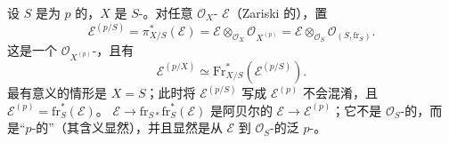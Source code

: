 设 $S$ 是为 $p$ 的，$X$ 是 $S$-。对任意 $\mathcal O_X$- $\mathcal E$（Zariski 的），置
\[
\mathcal E^{(p/S)}=\pi_{X/S}^{*}(\mathcal E)
=\mathcal E\otimes_{\mathcal O_X}\mathcal O_{X^{(p)}}
=\mathcal E\otimes_{\mathcal O_S}\mathcal O_{(S,\mathrm{fr}_S)}.
\]
这是一个 $\mathcal O_{X^{(p)}}$-，且有
\[
\mathcal E^{(p/X)}\simeq\mathrm{Fr}_{X/S}^{*}(\mathcal E^{(p/S)}).
\]
最有意义的情形是 $X=S$；此时将 $\mathcal E^{(p/S)}$ 写成 $\mathcal E^{(p)}$ 不会混淆，且 $\mathcal E^{(p)}=\mathrm{fr}_S^{*}(\mathcal E)$。 $\mathcal E\to\mathrm{fr}_{S*}\mathrm{fr}_S^{*}(\mathcal E)$ 是阿贝尔的 $\mathcal E\to\mathcal E^{(p)}$；它不是 $\mathcal O_S$-的，而是“$p$-的”（其含义显然），并且显然是从 $\mathcal E$ 到 $\mathcal O_S$-的泛 $p$-。

